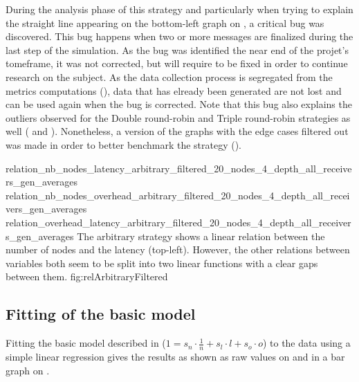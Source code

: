 During the analysis phase of this strategy and particularly when trying to
explain the straight line appearing on the bottom-left graph on
, a critical bug was discovered. This bug happens when two
or more messages are finalized during the last step of the simulation. As the
bug was identified the near end of the projet's tomeframe, it was not corrected,
but will require to be fixed in order to continue research on the subject. As
the data collection process is segregated from the metrics computations
(), data that has elready been generated are not
lost and can be used again when the bug is corrected. Note that this bug also
explains the outliers observed for the Double round-robin and Triple round-robin
strategies as well ( and ).
Nonetheless, a version of the graphs with the edge cases filtered out was made
in order to better benchmark the strategy ().

\triplefigure
    {relation_nb_nodes_latency_arbitrary_filtered_20_nodes_4_depth_all_receivers_gen_averages}
    {relation_nb_nodes_overhead_arbitrary_filtered_20_nodes_4_depth_all_receivers_gen_averages}
    {relation_overhead_latency_arbitrary_filtered_20_nodes_4_depth_all_receivers_gen_averages}
    {The arbitrary strategy shows a linear relation between the number of
    nodes and the latency (top-left). However, the other relations between
    variables both seem to be split into two linear functions with a clear gaps
    between them.}
    {fig:relArbitraryFiltered}



\FloatBarrier
\subsection{Fitting of the basic model}
\label{ssec:fittingBase}
Fitting the basic model described in  (\(1 = s_n
\cdot \frac{1}{n} + s_l\cdot l + s_o\cdot o\)) to the data using a simple linear
regression gives the results as shown as raw values on
 and in a bar graph on
.

